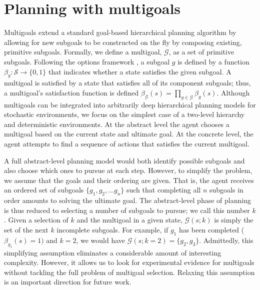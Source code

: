 \documentclass[10pt,letterpaper]{article}
\begin{document}
\section{Planning with multigoals}
\newcommand{\multigoal}{\mathcal{G}}

Multigoals extend a standard goal-based hierarchical planning algorithm by allowing for new subgoals to be constructed on the fly by composing existing, primitive subgoals. Formally, we define a multigoal,  $\multigoal$, as a set of primitive subgoals. Following the options framework \citep{sutton1999between}, a subgoal $g$ is defined by a function 
$\beta_g: \mathcal{S} \rightarrow \{0, 1\}$
that indicates whether a state satisfies the given subgoal. A multigoal is satisfied by a state that satisfies all of its component subgoals; thus, a multigoal's satisfaction function is defined
$\beta_{\multigoal}(s) = \prod_{g \in \multigoal} \beta_g(s)$. Although multigoals can be integrated into arbitrarily deep hierarchical planning models for stochastic environments, we focus on the simplest case of a two-level hierarchy and deterministic environments. At the abstract level the agent chooses a multigoal based on the current state and ultimate goal. At the concrete level, the agent attempts to find a sequence of actions that satisfies the current multigoal.

A full abstract-level planning model would both identify possible subgoals and also choose which ones to pursue at each step. However, to simplify the problem, we assume that the goals and their ordering are given. That is, the agent receives an ordered set of subgoals $\{ g_1, g_2, \dots g_n  \}$ such that completing all $n$ subgoals in order amounts to solving the ultimate goal. The abstract-level phase of planning is thus reduced to selecting a number of subgoals to pursue; we call this number $k$. Given a selection of $k$ and the multigoal in a given state, $\multigoal(s; k)$ is simply the set of the next $k$ incomplete subgoals. For example, if $g_1$ has been completed ($\beta_{g_1}(s) = 1)$ and $k=2$, we would have $\multigoal(s; k=2) = \{ g_2, g_3 \}$. Admittedly, this simplifying assumption eliminates a considerable amount of interesting complexity. However, it allows us to look for experimental evidence for multigoals without tackling the full problem of multigoal selection. Relaxing this assumption is an important direction for future work.

\end{document}
